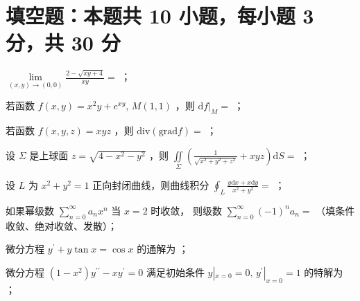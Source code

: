 
\section{填空题：本题共 10 小题，每小题 3 分，共 30 分}

\begin{question}[points = 3]
    $\lim\limits_{(x, y) \to (0, 0)} \frac{2 - \sqrt{xy + 4}}{xy} = $ \fillin[]；
\end{question}

\begin{question}[points = 3]
    若函数 $f(x, y) = x^2y + e^{xy},\, M(1,1)$ ，则 $\mathrm{d}f|_M = $ \fillin[]；
\end{question}

\begin{question}[points = 3]
    若函数 $f(x, y, z) = xyz$ ，则 $\mathrm{div}(\mathrm{grad}f) = $ \fillin[]；
\end{question}

\begin{question}[points = 3]
    设 $\Sigma$ 是上球面 $z = \sqrt{4 - x^2 - y^2}$ ，则
    $\iint\limits_\Sigma \left(\frac{1}{\sqrt{x^2 + y^2 + z^2}} + xyz\right)\mathrm{d}S = $ \fillin[]；
\end{question}

\begin{question}[points = 3]
    设 $L$ 为 $x^2 + y^2 = 1$ 正向封闭曲线，则曲线积分 $\oint_L \frac{y\mathrm{d}x + x\mathrm{d}y}{x^2 + y^2} = $ \fillin[]；
\end{question}

\begin{question}[points = 3]
    如果幂级数 $\sum\limits_{n = 0}^{\infty} a_nx^n$ 当 $x = 2$ 时收敛，
    则级数 $\sum\limits_{n = 0}^{\infty} (-1)^na_n = $ \fillin[] （填条件收敛、绝对收敛、发散）；
\end{question}

\begin{question}[points = 3]
    微分方程 $y^{\prime} + y\tan{x} = \cos{x}$ 的通解为 \fillin[]；
\end{question}

\begin{question}[points = 3]
    微分方程 $(1 - x^2)y^{\prime\prime} - xy^{\prime} = 0$ 满足初始条件
    $y|_{x = 0} = 0,\, y^{\prime}|_{x = 0} = 1$ 的特解为 \fillin[]；
\end{question}

